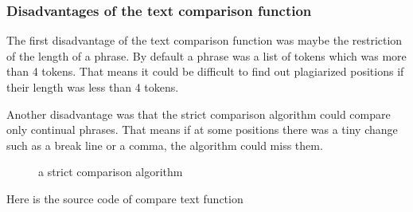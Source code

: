 \subsubsection{Disadvantages of the text comparison function}

The first disadvantage of the text comparison function was maybe the restriction of the length of a phrase. By default a phrase was a list of tokens which was more than 4 tokens. That means it could be difficult to find out plagiarized positions if their length was less than 4 tokens. 

Another disadvantage was that the strict comparison algorithm could compare only continual phrases. That means if at some positions there was a tiny change such as a break line or a comma, the algorithm could miss them.

\begin{figure}[!h]
  \centering
  \caption{a strict comparison algorithm}
  \label{fig:report_deckblatt}
\end{figure}

Here is the source code of compare text function

